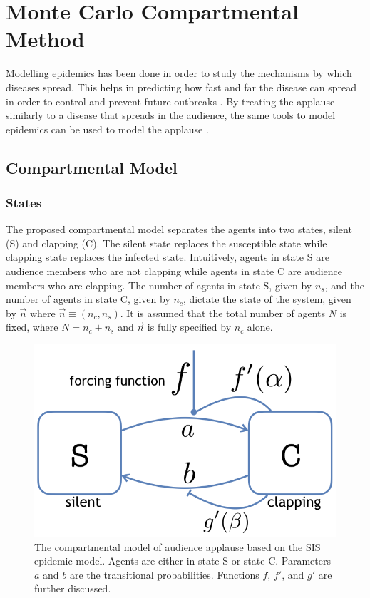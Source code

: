 \chapter{Monte Carlo Compartmental Method}
\label{chap2}

\hspace{\parindent} Modelling epidemics has been done in order to study the mechanisms by which diseases spread. This helps in predicting how fast and far the disease can spread in order to control and prevent future outbreaks \cite{Arino453}. By treating the applause similarly to a disease that spreads in the audience, the same tools to model epidemics can be used to model the applause \cite{Mann20130466}. 

\section{Compartmental Model}
\subsection{States}

\hspace{\parindent}The proposed compartmental model separates the agents into two states, silent (S) and clapping (C). The silent state replaces the susceptible state while clapping state replaces the infected state. 
Intuitively, agents in state S are audience members who are not clapping while agents in state C are audience members who are clapping.
The number of agents in state S, given by $n_{s}$, and the number of agents in state C, given by $n_{c}$, dictate the state of the system, given by $\vec{n}$ where $\vec{n}\equiv(n_{c},n_{s})$.
It is assumed that the total number of agents $N$ is fixed, where $N = n_{c} + n_{s}$ and $\vec{n}$ is fully specified by $n_{c}$ alone.

\begin{figure}
 \centering
  \includegraphics[width=0.5\linewidth]{images/chapter2/model2.png}
  \caption{The compartmental model of audience applause based on the SIS epidemic model. Agents are either in state S or state C. Parameters $a$ and $b$ are the transitional probabilities. Functions $f$, $f'$, and $g'$ are further discussed.}
  \label{fig:SCSmodel}
\end{figure}

